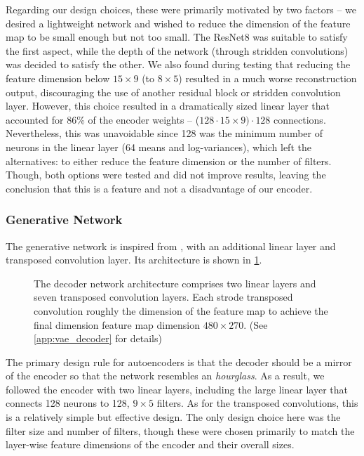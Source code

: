 Regarding our design choices, these were primarily motivated by two factors -- we desired a lightweight network and wished to reduce the dimension of the feature map to be small enough but not too small. 
The ResNet8 was suitable to satisfy the first aspect, while the depth of the network (through stridden convolutions) was decided to satisfy the other. We also found during testing that reducing the feature dimension below $15 \times 9$ (to $8 \times 5$) resulted in a much worse reconstruction output, discouraging the use of another residual block or stridden convolution layer.
However, this choice resulted in a dramatically sized linear layer that accounted for 86\% of the encoder weights -- ($128 \cdot 15\times9) \cdot 128$ connections.
Nevertheless, this was unavoidable since 128 was the minimum number of neurons in the linear layer (64 means and log-variances), which left the alternatives: to either reduce the feature dimension or the number of filters. Though, both options were tested and did not improve results, leaving the conclusion that this is a feature and not a disadvantage of our encoder.


\subsubsection{Generative Network}
\label{subsubsec:5_vae_generative_network}
The generative network is inspired from \cite{vae_decoder_architecture}, with an additional linear layer and transposed convolution layer. Its architecture is shown in \cref{fig:5_decoder}. 
\begin{figure}[hbt]
    \centering
    \caption{The decoder network architecture comprises two linear layers and seven transposed convolution layers. Each strode transposed convolution roughly the dimension of the feature map to achieve the final dimension feature map dimension $480\times270$. (See \cref{app:vae_decoder} for details)}
    \label{fig:5_decoder}
\end{figure}
The primary design rule for autoencoders is that the decoder should be a mirror of the encoder so that the network resembles an \textit{hourglass}. As a result, we followed the encoder with two linear layers, including the large linear layer that connects 128 neurons to 128, $9\times5$ filters. As for the transposed convolutions, this is a relatively simple but effective design. The only design choice here was the filter size and number of filters, though these were chosen primarily to match the layer-wise feature dimensions of the encoder and their overall sizes.

